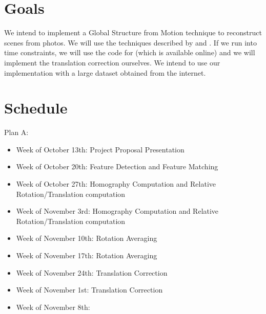 \documentclass[conference, 12pt]{acmsiggraph}
\begin{document}
\section{Goals}

We intend to implement a Global Structure from Motion technique to reconstruct scenes from photos. We will use the techniques described by \cite{rotation} and \cite{translation}. If we run into time constraints, we will use the code for \cite{rotation} (which is available online) and we will implement the translation correction ourselves. We intend to use our implementation with a large dataset obtained from the internet.

\section{Schedule}

Plan A:

\begin{itemize}
	\item {Week of October 13th}: Project Proposal Presentation
	\item {Week of October 20th}: Feature Detection and Feature Matching
	\item {Week of October 27th}: Homography Computation and Relative Rotation/Translation computation
	\item {Week of November 3rd}: Homography Computation and Relative Rotation/Translation computation
	\item {Week of November 10th}: Rotation Averaging
	\item {Week of November 17th}: Rotation Averaging
	\item {Week of November 24th}: Translation Correction
	\item {Week of November 1st}: Translation Correction
	\item {Week of November 8th}:


\end{itemize}





\end{document}
